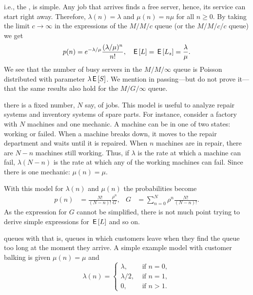  i.e., the  , is simple.
Any job that arrives finds a free server, hence, its service can start right away.
Therefore, $\lambda(n)=\lambda$ and $\mu(n) = n \mu$ for all $n\geq 0$.
By taking the limit $c\to \infty$ in the expressions of the $M/M/c$ queue (or the $M/M/c/c$ queue) we get
\begin{align*}
  p(n) &= e^{-\lambda/\mu} \frac{(\lambda/\mu)^n}{n!}, & \,\mathsf{E}\left[L\right] = \,\mathsf{E}\left[L_s\right] = \frac \lambda \mu.
\end{align*}
We see that the number of busy servers in the $M/M/\infty$ queue is Poisson distributed with parameter $\lambda \,\mathsf{E}\left[S\right]$.
We mention in passing---but do not prove it---that the same results also hold for the $M/G/\infty$ queue.

 there is a fixed number, $N$ say, of jobs.
This model is useful to analyze repair systems and inventory systems of spare parts. 
For instance, consider a factory with $N$ machines and one mechanic.
A machine can be in one of two states: working or failed.
When a machine breaks down, it moves to the repair department and waits until it is repaired.
When $n$ machines are in repair, there are $N-n$ machines still working.
Thus, if $\lambda$ is the rate at which a machine can fail, $\lambda(N-n)$ is the rate at which any of the working machines can fail.
Since there is one mechanic: $\mu(n)=\mu$.


With this model for $\lambda(n)$ and $\mu(n)$ the probabilities become 
\begin{align*}
 p(n)  &= \frac{N!}{(N-n)!}\frac{\rho^n}{G}, & G &= \sum_{n=0}^N \rho^n \frac{N!}{(N-n)!}.
\end{align*}
As the expression for $G$ cannot be simplified, there is not much point trying to derive simple expressions for $\,\mathsf{E}\left[L\right]$ and so on. 


 queues with  that is, queues in
which customers leave when they find the queue too long at the moment
they arrive. A simple example model with customer balking is given  $\mu(n)=\mu$ and
 \begin{equation*}
 \lambda(n) = 
 \begin{cases}
 \lambda, &\text{ if } n=0, \\
 \lambda/2, &\text{ if } n=1, \\
 0, &\text{ if } n > 1.
 \end{cases}
 \end{equation*}

